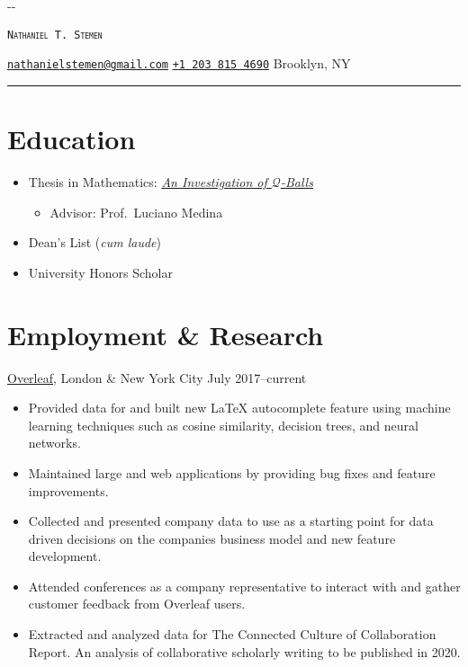 \documentclass{cultvoucher}
\begin{document}
\thispagestyle{firststyle}

\begin{adjustwidth}{\dimexpr-\marginparsep-\marginparwidth}{}
\begin{center}
    {\Huge \textsc{\texttt{Nathaniel T. Stemen}}\par}
    \href{mailto:nathanielstemen@gmail.com}{\texttt{nathanielstemen@gmail.com}} \textbullet{}
    \href{tel:12038154690}{\texttt{+1\,203\,815\,4690}} \textbullet{}
    Brooklyn, NY
    \rule{\dimexpr\textwidth+\marginparsep+\marginparwidth}{0.4pt}\par
\end{center}
\end{adjustwidth}

\section{Education}
\begin{itemize}
    \item Thesis in Mathematics: \href{https://github.com/natestemen/q-vortex-thesis}{\textit{An Investigation of \(\mathcal{Q}\)-Balls}}
    \begin{itemize}
          \item Advisor: Prof.\ Luciano Medina
    \end{itemize}
    \item Dean's List (\textit{cum laude})
    \item University Honors Scholar
\end{itemize}

\section{Employment \& Research}
         {\href{https://www.overleaf.com/}{Overleaf}, London \& New York City}
         {July 2017--current}
\begin{itemize}
    \vspace{-0.25em}
    \item Provided data for and built new \LaTeX{} autocomplete feature using
          machine learning techniques such as cosine similarity, decision trees,
          and neural networks.
    \item Maintained large  and  web applications
          by providing bug fixes and feature improvements.
    \item Collected and presented company data to use as a starting point for
          data driven decisions on the companies business model and new feature
          development.
    \item Attended conferences as a company representative to interact with and
          gather customer feedback from Overleaf users.
    \item Extracted and analyzed data for The Connected Culture of Collaboration
          Report. An analysis of collaborative scholarly writing to be published
          in 2020.
\end{itemize}
\end{document}
